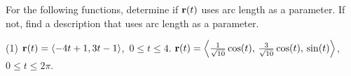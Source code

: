 \documentclass[mathNotesPreamble]{subfiles}
\begin{document}
  \begin{ex*}
    For the following functions, determine if ${\mathbf{r}}(t)$ uses arc length as a parameter. If not, find a description that uses arc length as a parameter.
  \end{ex*}
  \begin{tasks}[after-item-skip=\stretch{1}](1)
    \task ${\mathbf{r}}(t)={\left\langle -4t+1,3t-1 \right\rangle}$,\ $0\leq t\leq 4$.
    \task ${\mathbf{r}}(t)={\left\langle \frac{1}{\sqrt{10}}\cos(t),\,\frac{3}{\sqrt{10}}\cos(t),\,\sin(t) \right\rangle}$,\ $0\leq t\leq 2\pi$.
  \end{tasks}
  \pagebreak
\end{document}
